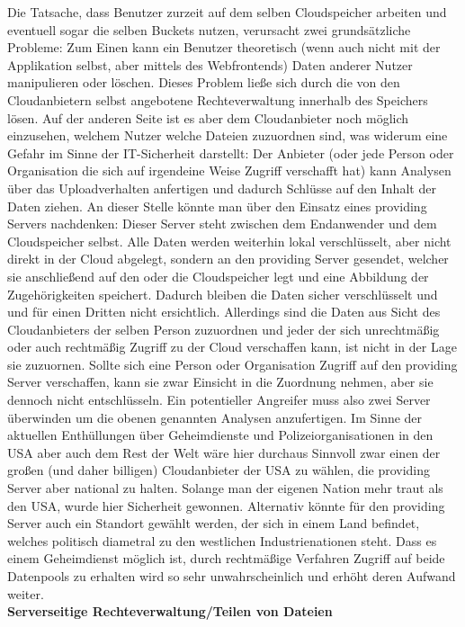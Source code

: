 \documentclass[12pt,a4paper,bibliography=totocnumbered,listof=totocnumbered]{scrartcl}
\begin{document}
Die Tatsache, dass Benutzer zurzeit auf dem selben Cloudspeicher arbeiten und eventuell sogar die selben Buckets nutzen, verursacht zwei grundsätzliche Probleme: Zum Einen kann ein Benutzer theoretisch (wenn auch nicht mit der Applikation selbst, aber mittels des Webfrontends) Daten anderer Nutzer manipulieren oder löschen. Dieses Problem ließe sich durch die von den Cloudanbietern selbst angebotene Rechteverwaltung innerhalb des Speichers lösen. Auf der anderen Seite ist es aber dem Cloudanbieter noch möglich einzusehen, welchem Nutzer welche Dateien zuzuordnen sind, was widerum eine Gefahr im Sinne der IT-Sicherheit darstellt: Der Anbieter (oder jede Person oder Organisation die sich auf irgendeine Weise Zugriff verschafft hat) kann Analysen über das Uploadverhalten anfertigen und dadurch Schlüsse auf den Inhalt der Daten ziehen. An dieser Stelle könnte man über den Einsatz eines providing Servers nachdenken: Dieser Server steht zwischen dem Endanwender und dem Cloudspeicher selbst. Alle Daten werden weiterhin lokal verschlüsselt, aber nicht direkt in der Cloud abgelegt, sondern an den providing Server gesendet, welcher sie anschließend auf den oder die Cloudspeicher legt und eine Abbildung der Zugehörigkeiten speichert. Dadurch bleiben die Daten sicher verschlüsselt und und für einen Dritten nicht ersichtlich. Allerdings sind die Daten aus Sicht des Cloudanbieters der selben Person zuzuordnen und jeder der sich unrechtmäßig oder auch rechtmäßig Zugriff zu der Cloud verschaffen kann, ist nicht in der Lage sie zuzuornen. Sollte sich eine Person oder Organisation Zugriff auf den providing Server verschaffen, kann sie zwar Einsicht in die Zuordnung nehmen, aber sie dennoch nicht entschlüsseln. Ein potentieller Angreifer muss also zwei Server überwinden um die obenen genannten Analysen anzufertigen. Im Sinne der aktuellen Enthüllungen über Geheimdienste und Polizeiorganisationen in den USA aber auch dem Rest der Welt wäre hier durchaus Sinnvoll zwar einen der großen (und daher billigen) Cloudanbieter der USA zu wählen, die providing Server aber national zu halten. Solange man der eigenen Nation mehr traut als den USA, wurde hier Sicherheit gewonnen. Alternativ könnte für den providing Server auch ein Standort gewählt werden, der sich in einem Land befindet, welches politisch diametral zu den westlichen Industrienationen steht. Dass es einem Geheimdienst möglich ist, durch rechtmäßige Verfahren Zugriff auf beide Datenpools zu erhalten wird so sehr unwahrscheinlich und erhöht deren Aufwand weiter.
\\\textbf{Serverseitige Rechteverwaltung/Teilen von Dateien}\\
\end{document}
